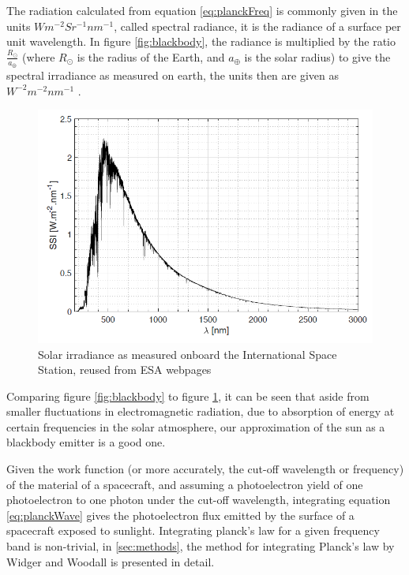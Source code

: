 The radiation calculated from equation \eqref{eq:planckFreq} is commonly given in the units $W m^{-2} Sr^{-1} nm^{-1}$, called spectral radiance, it is the radiance of a surface per unit wavelength. In figure \ref{fig:blackbody}, the radiance is multiplied by the ratio $\frac{R_{\odot}}{a_{\oplus}}$ (where $R_{\odot}$ is the radius of the Earth, and $a_{\oplus}$ is the solar radius) to give the spectral irradiance as measured on earth, the units then are given as  $W^{-2} m^{-2} nm^{-1}$ .

\begin{figure}
    \centering
    \includegraphics[scale=0.6]{figures/ReferenceFigures/solarspectrum.png}
    \caption{Solar irradiance as measured onboard the International Space Station, reused from ESA webpages \parencite{ESAb}}
    \label{fig:solIrradiance}
\end{figure}

\newpage

Comparing figure \ref{fig:blackbody} to figure \ref{fig:solIrradiance}, it can be seen that aside from smaller fluctuations in electromagnetic radiation, due to absorption of energy at certain frequencies in the solar atmosphere, our approximation of the sun as a blackbody emitter is a good one. 

Given the work function (or more accurately, the cut-off wavelength or frequency) of the material of a spacecraft, and assuming a photoelectron yield of one photoelectron to one photon under the cut-off wavelength, integrating equation \eqref{eq:planckWave} gives the photoelectron flux emitted by the surface of a spacecraft exposed to sunlight. Integrating planck's law for a given frequency band is non-trivial, in \ref{sec:methods}, the method for integrating Planck's law by Widger and Woodall \parencite{Widger1976} is presented in detail. 


